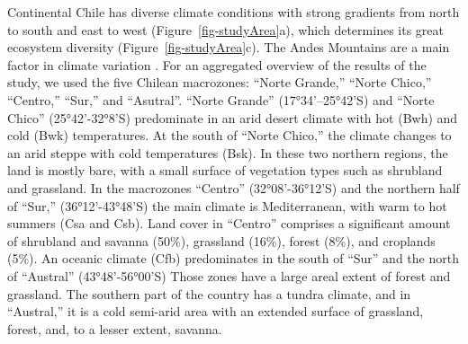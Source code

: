 \documentclass[
  authoryear,
  preprint,
  3p,
  onecolumn]{elsarticle}
\begin{document}
Continental Chile has diverse climate conditions with strong gradients
from north to south and east to west \citep{Aceituno2021}
(Figure~\ref{fig-studyArea}a), which determines its great ecosystem
diversity \citep{Luebert2022} (Figure~\ref{fig-studyArea}c). The Andes
Mountains are a main factor in climate variation \citep{Garreaud2009}.
For an aggregated overview of the results of the study, we used the five
Chilean macrozones: ``Norte Grande,'' ``Norte Chico,'' ``Centro,''
``Sur,'' and ``Asutral''. ``Norte Grande'' (17°34'--25°42'S) and ``Norte
Chico'' (25°42'-32°8'S) predominate in an arid desert climate with hot
(Bwh) and cold (Bwk) temperatures. At the south of ``Norte Chico,'' the
climate changes to an arid steppe with cold temperatures (Bsk). In these
two northern regions, the land is mostly bare, with a small surface of
vegetation types such as shrubland and grassland. In the macrozones
``Centro'' (32°08'-36°12'S) and the northern half of ``Sur,''
(36°12'-43°48'S) the main climate is Mediterranean, with warm to hot
summers (Csa and Csb). Land cover in ``Centro'' comprises a significant
amount of shrubland and savanna (50\%), grassland (16\%), forest (8\%),
and croplands (5\%). An oceanic climate (Cfb) predominates in the south
of ``Sur'' and the north of ``Austral'' (43°48'-56°00'S) Those zones
have a large areal extent of forest and grassland. The southern part of
the country has a tundra climate, and in ``Austral,'' it is a cold
semi-arid area with an extended surface of grassland, forest, and, to a
lesser extent, savanna.
\end{document}
